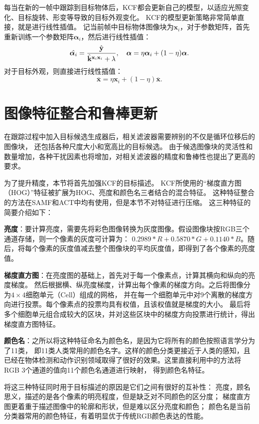 每当在新的一帧中跟踪到目标物体后，KCF都会更新自己的模型，以适应光照变化、目标旋转、形变等导致的目标外观变化。
KCF的模型更新策略非常简单直接，就是进行线性插值。
记当前帧中目标物体图像块为$\mathbf{x}_i$，对于参数矩阵，首先重新训练一个参数矩阵$\boldsymbol{\alpha}_i$，然后进行线性插值：
\begin{equation}
	\hat{\boldsymbol{\alpha}_i}=\frac{\hat{\mathbf{y}}}{\hat{\mathbf{k}}{}^{\mathbf{x}_i\mathbf{x}_i}+\lambda}, \\ \ \ \ 
	\boldsymbol{\alpha}=\eta{\boldsymbol{\alpha}_i} + ( 1-\eta )\boldsymbol{\alpha}.
	\label{kcf_learning2}
\end{equation}
对于目标外观，则直接进行线性插值：
\begin{equation}
\overline{\mathbf{x}}=\eta\mathbf{x}_i+(1-\eta)\overline{\mathbf{x}}.
\end{equation}


\section{图像特征整合和鲁棒更新}
在跟踪过程中加入目标候选生成器后，相关滤波器需要辨别的不仅是循环位移后的图像块，
还包括各种尺度大小和宽高比的目标候选。
由于候选图像块的灵活性和数量增加，各种干扰因素也将增加，对相关滤波器的精度和鲁棒性也提出了更高的要求。

为了提升精度，本节将首先加强KCF的目标描述。
KCF所使用的``梯度直方图（HOG）''特征被扩展为HOG、亮度和颜色名三者结合的混合特征。
这种特征整合的方法在SAMF和ACT中均有使用，但是本节不对特征进行压缩。
这三种特征的简要介绍如下：
\begin{compactitem}
\item{\textbf{亮度}：要计算亮度，需要先将彩色图像转换为灰度图像。假设图像块按RGB三个通道存储，则一个像素的灰度可计算为：
$0.2989 * R + 0.5870 * G + 0.1140 * B$。随后，将每个像素的灰度值减去整个图像块的平均灰度值，即得到了各个像素的亮度值。}
\item{\textbf{梯度直方图}\upcite{hog}：在亮度图的基础上，首先对于每一个像素点，计算其横向和纵向的亮度梯度。
然后根据横、纵亮度梯度，计算出每个像素的梯度方向。之后将图像分为$4\times4$细胞单元（Cell）组成的网格，
并在每一个细胞单元中对9个离散的梯度方向进行投票。每个像素点的投票均具有权值，且该权值就是梯度的大小。
最后将多个细胞单元组合成较大的区块，并对这些区块中的梯度方向投票进行统计，得出梯度直方图特征。}
\item{\textbf{颜色名}：之所以将这种特征命名为颜色名，是因为它将所有的颜色按照语言学分为了11类，
即11类人类常用的颜色名字。这样的颜色分类更接近于人类的感知，且已经在物体检测\upcite{colornaminguse2}和动作识别领域取得了很好的效果。这里直接利用\cite{colornaming}中的方法将RGB 3个通道的值向11个颜色名通道进行映射，
得到颜色名特征。}
\end{compactitem}
将这三种特征同时用于目标描述的原因是它们之间有很好的互补性：
亮度，顾名思义，描述的是各个像素的明亮程度，但是缺乏对不同颜色的区分度；
梯度直方图更着重于描述图像中的轮廓和形状，但是难以区分亮度和颜色；
颜色名是当前分类器常用的颜色特征，有着明显优于传统RGB颜色表达的性能。



